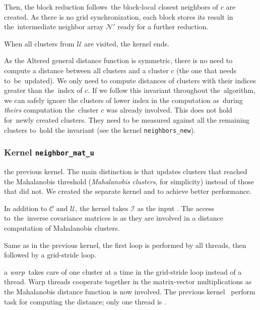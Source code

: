 Then, the block reduction follows\xxx{;}\ the block-local closest neighbors of $c$ are created. As there is no grid synchronization, each block stores its result in the~intermediate neighbor array $\mathcal{N}'$ ready for a further reduction.

When all clusters from $\mathcal{U}$ are visited, the kernel ends.

\begin{rem}
	As the Altered general distance function is symmetric, there is no need to compute a distance between all clusters and a cluster $c$ (the one that needs to~be~updated). We only need to compute distances of clusters with their indices greater than the~index of $c$. If we follow this invariant throughout the~algorithm, we can safely ignore the clusters of lower index in the computation as~during \emph{theirs} computation the~cluster $c$ was already involved. This does not hold for~newly created clusters. They need to be measured against all the remaining clusters to~hold the invariant (see the kernel \texttt{neighbors\_new}).
\end{rem}

\subsubsection{Kernel \texttt{neighbor\_mat\_u}}  the previous kernel. The main distinction is that  updates clusters that reached the Mahalanobis threshold (\emph{Mahalanobis clusters}, for simplicity) instead of those that did not. We created the separate kernel  and to achieve  better performance.

In addition to $\mathcal{C}$ and $\mathcal{U}$, the kernel takes $\mathcal{I}$ as the input . The access to~the~inverse covariance matrices is  as they are involved in a distance computation of Mahalanobis clusters. 

Same as in the previous kernel, the first loop is performed by all threads, then followed by a grid-stride loop. 

 a \emph{warp}\ takes care of one cluster at a time in the grid-stride loop instead of a thread. Warp threads cooperate together in the matrix-vector multiplications as the Mahalanobis distance function is now involved. The previous kernel ~perform  task for computing the distance;  only one thread is .

